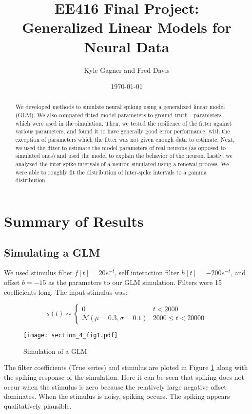 \documentclass[letterpaper,titlepage,10pt]{article}
\title{EE416 Final Project:\\Generalized Linear Models for Neural Data}
\date{\today}
\author{Kyle Gagner and Fred Davis}
\begin{document}
\maketitle

\begin{abstract}

We developed methods to simulate neural spiking using a generalized linear model (GLM). We also compared fitted model
parameters to ground truth - parameters which were used in the simulation. Then, we tested the resilience of the fitter
against various parameters, and found it to have generally good error performance, with the exception of parameters
which the fitter was not given enough data to estimate. Next, we used the fitter to estimate the model parameters of
real neurons (as opposed to simulated ones) and used the model to explain the behavior of the neuron. Lastly, we
analyzed the inter-spike intervals of a neuron simulated using a renewal process. We were able to roughly fit the
distribution of inter-spike intervals to a gamma distribution.

\end{abstract}

\section{Summary of Results}

\subsection{Simulating a GLM}

We used stimulus filter $f[t]=20e^{-t}$, self interaction filter $h[t]=-200e^{-t}$, and offset $b=-15$ as the
parameters to our GLM simulation. Filters were 15 coefficients long. The input stimulus was:

$$s(t)\sim
\begin{cases}
0 & t < 2000\\
\mathcal{N}(\mu=0.3, \sigma=0.1) & 2000 \leq t < 20000
\end{cases}$$

\begin{figure}[H]
\texttt{[image: section\_4\_fig1.pdf]}
\caption{Simulation of a GLM}
\label{fig41}
\end{figure}

The filter coefficients (True series) and stimulus are ploted in Figure \ref{fig41} along with the spiking
response of the simulation. Here it can be seen that spiking does not occur when the stimulus is zero because the
relatively large negative offset dominates. When the stimulus is noisy, spiking occurs. The spiking appears
qualitatively plausible.
\end{document}
